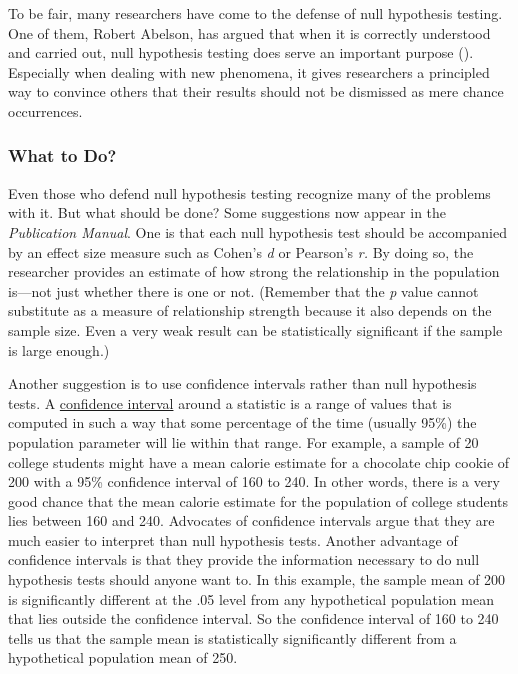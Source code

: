 \documentclass[
]{krantz}
\begin{document}
To be fair, many researchers have come to the defense of null hypothesis testing. One of them, Robert Abelson, has argued that when it is correctly understood and carried out, null hypothesis testing does serve an important purpose (). Especially when dealing with new phenomena, it gives researchers a principled way to convince others that their results should not be dismissed as mere chance occurrences.

\subsubsection*{What to Do?}\label{what-to-do}


Even those who defend null hypothesis testing recognize many of the problems with it. But what should be done? Some suggestions now appear in the \emph{Publication Manual}. One is that each null hypothesis test should be accompanied by an effect size measure such as Cohen's \emph{d} or Pearson's \emph{r.} By doing so, the researcher provides an estimate of how strong the relationship in the population is---not just whether there is one or not. (Remember that the \emph{p} value cannot substitute as a measure of relationship strength because it also depends on the sample size. Even a very weak result can be statistically significant if the sample is large enough.)

Another suggestion is to use confidence intervals rather than null hypothesis tests. A \hyperref[confidence-interval]{confidence interval} around a statistic is a range of values that is computed in such a way that some percentage of the time (usually 95\%) the population parameter will lie within that range. For example, a sample of 20 college students might have a mean calorie estimate for a chocolate chip cookie of 200 with a 95\% confidence interval of 160 to 240. In other words, there is a very good chance that the mean calorie estimate for the population of college students lies between 160 and 240. Advocates of confidence intervals argue that they are much easier to interpret than null hypothesis tests. Another advantage of confidence intervals is that they provide the information necessary to do null hypothesis tests should anyone want to. In this example, the sample mean of 200 is significantly different at the .05 level from any hypothetical population mean that lies outside the confidence interval. So the confidence interval of 160 to 240 tells us that the sample mean is statistically significantly different from a hypothetical population mean of 250.
\end{document}
